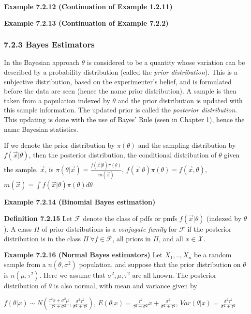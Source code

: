 \documentclass[6pt,twocolumn,Portrait]{article}
\begin{document}
\textbf{Example 7.2.12 (Continuation of Example 1.2.11)}

\textbf{Example 7.2.13 (Continuation of Example 7.2.2)}

\hypertarget{BayesE}{%
\subsubsection{7.2.3 Bayes Estimators}\label{BayesE}}

In the Bayesian approach \(\theta\) is considered to be a quantity whose
variation can be described by a probability distribution (called the
\emph{prior distribution}). This is a subjective distribution, based on
the experimenter's belief, and is formulated before the data are seen
(hence the name prior distribution). A sample is then taken from a
population indexed by \(\theta\) and the prior distribution is updated
with this sample information. The updated prior is called the
\emph{posterior distribution}. This updating is done with the use of
Bayes' Rule (seen in Chapter 1), hence the name Bayesian statistics.

If we denote the prior distribution by \(\pi(\theta)\) and the sampling
distribution by \(f(\vec x|\theta)\), then the posterior distribution,
the conditional distribution of \(\theta\) given the sample, \(\vec x\),
is \(\pi(\theta|\vec x)=\frac{f(\vec x|\theta)\pi(\theta)}{m(\vec x)}\),
\(f(\vec x|\theta)\pi(\theta)=f(\vec x,\theta)\),
\(m(\vec x)=\int f(\vec x|\theta)\pi(\theta)d\theta\)

\textbf{Example 7.2.14 (Binomial Bayes estimation)}

\textbf{Definition 7.2.15} Let \(\mathcal{F}\) denote the class of pdfs
or pmfs \(f(\vec x|\theta)\) (indexed by \(\theta\)). A class \(\Pi\) of
prior distributions is a \emph{conjugate family} for \(\mathcal{F}\) if
the posterior distribution is in the class
\(\Pi\ \forall f\in\mathcal{F}\), all priors in \(\Pi\), and all
\(x\in\mathcal{X}\).

\textbf{Example 7.2.16 (Normal Bayes estimators)} Let \(X_1,..,X_n\) be
a random sample from a \(n(\theta,\sigma^2)\) population, and suppose
that the prior distribution on \(\theta\) is \(n(\mu,\tau^2)\). Here we
assume that \(\sigma^2, \mu, \tau^2\) are all known. The posterior
distribution of \(\theta\) is also normal, with mean and variance given
by

\(f(\theta|x)\sim N(\frac{\tau^2x+\sigma^2\mu}{\tau^2+\sigma^2},\frac{\sigma^2\tau^2}{\sigma^2+\tau^2})\),
\(E(\theta|x)=\frac{\tau^2}{\tau^2+\sigma^2}x+\frac{\sigma^2}{\sigma^2+\tau^2}\),
\(Var(\theta|x)=\frac{\sigma^2\tau^2}{\sigma^2+\tau^2}\)
\end{document}
